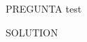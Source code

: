 
\question[20] PREGUNTA test

\noaddpoints
\begin{parts}
\part[10]
\part[10]
\end{parts}

\begin{solution}
SOLUTION

\end{solution}

